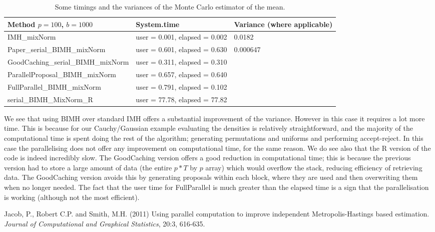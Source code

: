 \documentclass[11pt,a4paper]{article}
\begin{document}
\begin{table}[H]
\centering

\caption{Some timings and the variances of the Monte Carlo estimator of the mean.}
\begin{tabular}{ | p{6.3cm} | p{5cm} | p{2.2cm} | }
\hline
    \textbf{Method} $p=100$, $b=1000$  & \textbf{System.time} & \textbf{Variance (where applicable)} \\ \hline
    IMH\_mixNorm & user = 0.001, elapsed = 0.002 & 0.0182\\ \hline
    Paper\_serial\_BIMH\_mixNorm & user = 0.601, elapsed =  0.630 & 0.000647\\ \hline
    GoodCaching\_serial\_BIMH\_mixNorm & user = 0.311, elapsed = 0.310 & \\ \hline
    ParallelProposal\_BIMH\_mixNorm & user = 0.657, elapsed = 0.640 & \\ \hline
	FullParallel\_BIMH\_mixNorm & user = 0.791, elapsed = 0.102 & \\ \hline
    serial\_BIMH\_MixNorm\_R & user = 77.78, elapsed = 77.82 & \\ \hline
   
\end{tabular}
\label{tab1}
\end{table}

We see that using BIMH over standard IMH offers a substantial improvement of the variance. However in this case it requires a lot more time. This is because for our Cauchy/Gaussian example evaluating the densities is relatively straightforward, and the majority of the computational time is spent doing the rest of the algorithm; generating permutations and uniforms and performing accept-reject. In this case the parallelising does not offer any improvement on computational time, for the same reason. We do see also that the R version of the code is indeed incredibly slow. The GoodCaching version offers a good reduction in computational time; this is because the previous version had to store a large amount of data (the entire $p*T$ by $p$ array) which would overflow the stack, reducing efficiency of retrieving data. The GoodCaching version avoids this by generating proposals within each block,  where they are used and then overwriting them when no longer needed. The fact that the user time for FullParallel is much greater than the elapsed time is a sign that the parallelisation is working (although not the most efficient).




\begin{thebibliography}{20}
	Jacob, P., Robert C.P. and Smith, M.H.
	(2011)
	Using parallel computation to improve independent Metropolis-Hastings based estimation.
	\textit{Journal of Computational and Graphical Statistics}, 20:3, 616-635.
	
\end{thebibliography}
\end{document}
